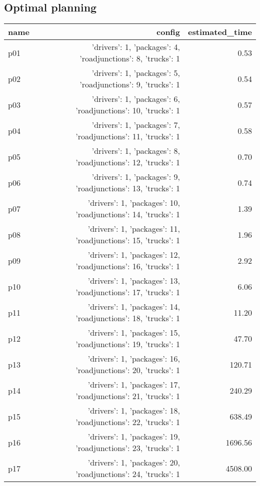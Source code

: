 \documentclass{article}
\begin{document}
                                \subsection*{Optimal planning}
                                
                            \begin{center}
                            \scriptsize
                            \begin{tabular}{@{}l|r|r@{}}
                            name & config & estimated\_time\\\midrule
                              p01&{'drivers': 1, 'packages': 4, 'roadjunctions': 8, 'trucks': 1}&0.53\\
  p02&{'drivers': 1, 'packages': 5, 'roadjunctions': 9, 'trucks': 1}&0.54\\
  p03&{'drivers': 1, 'packages': 6, 'roadjunctions': 10, 'trucks': 1}&0.57\\
  p04&{'drivers': 1, 'packages': 7, 'roadjunctions': 11, 'trucks': 1}&0.58\\
  p05&{'drivers': 1, 'packages': 8, 'roadjunctions': 12, 'trucks': 1}&0.70\\
  p06&{'drivers': 1, 'packages': 9, 'roadjunctions': 13, 'trucks': 1}&0.74\\
  p07&{'drivers': 1, 'packages': 10, 'roadjunctions': 14, 'trucks': 1}&1.39\\
  p08&{'drivers': 1, 'packages': 11, 'roadjunctions': 15, 'trucks': 1}&1.96\\
  p09&{'drivers': 1, 'packages': 12, 'roadjunctions': 16, 'trucks': 1}&2.92\\
  p10&{'drivers': 1, 'packages': 13, 'roadjunctions': 17, 'trucks': 1}&6.06\\
  p11&{'drivers': 1, 'packages': 14, 'roadjunctions': 18, 'trucks': 1}&11.20\\
  p12&{'drivers': 1, 'packages': 15, 'roadjunctions': 19, 'trucks': 1}&47.70\\
  p13&{'drivers': 1, 'packages': 16, 'roadjunctions': 20, 'trucks': 1}&120.71\\
  p14&{'drivers': 1, 'packages': 17, 'roadjunctions': 21, 'trucks': 1}&240.29\\
  p15&{'drivers': 1, 'packages': 18, 'roadjunctions': 22, 'trucks': 1}&638.49\\
  p16&{'drivers': 1, 'packages': 19, 'roadjunctions': 23, 'trucks': 1}&1696.56\\
  p17&{'drivers': 1, 'packages': 20, 'roadjunctions': 24, 'trucks': 1}&4508.00\\

\end{tabular}
\end{center}
\end{document}
